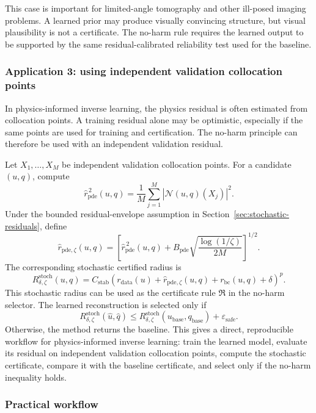 \documentclass{article}
\numberwithin{equation}{section}
\theoremstyle{definition}
\begin{document}
This case is important for limited-angle tomography and other ill-posed imaging problems. A learned prior may produce visually convincing structure, but visual plausibility is not a certificate. The no-harm rule requires the learned output to be supported by the same residual-calibrated reliability test used for the baseline.

\subsubsection{Application 3: using independent validation collocation points}

In physics-informed inverse learning, the physics residual is often estimated from collocation points. A training residual alone may be optimistic, especially if the same points are used for training and certification. The no-harm principle can therefore be used with an independent validation residual.

Let \(X_1,\ldots,X_M\) be independent validation collocation points. For a candidate \((u,q)\), compute
\[
\widehat r_{\mathrm{pde}}^{\,2}(u,q)
=
\frac{1}{M}
\sum_{j=1}^{M}
\left|
\mathcal N(u,q)(X_j)
\right|^2 .
\]
Under the bounded residual-envelope assumption in Section~\ref{sec:stochastic-residuals}, define
\[
\widehat r_{\mathrm{pde},\zeta}(u,q)
=
\left[
\widehat r_{\mathrm{pde}}^{\,2}(u,q)
+
B_{\mathrm{pde}}
\sqrt{
\frac{\log(1/\zeta)}{2M}
}
\right]^{1/2}.
\]
The corresponding stochastic certified radius is
\[
R_{\delta,\zeta}^{\mathrm{stoch}}(u,q)
=
C_{\mathrm{stab}}
\left(
r_{\mathrm{data}}(u)
+
\widehat r_{\mathrm{pde},\zeta}(u,q)
+
r_{\mathrm{bc}}(u,q)
+
\delta
\right)^p .
\]
This stochastic radius can be used as the certificate rule \(\mathfrak R\) in the no-harm selector. The learned reconstruction is selected only if
\[
R_{\delta,\zeta}^{\mathrm{stoch}}(\widehat u,\widehat q)
\le
R_{\delta,\zeta}^{\mathrm{stoch}}(u_{\mathrm{base}},q_{\mathrm{base}})
+
\varepsilon_{\mathrm{safe}} .
\]
Otherwise, the method returns the baseline. This gives a direct, reproducible workflow for physics-informed inverse learning: train the learned model, evaluate its residual on independent validation collocation points, compute the stochastic certificate, compare it with the baseline certificate, and select only if the no-harm inequality holds.

\subsubsection{Practical workflow}
\end{document}
